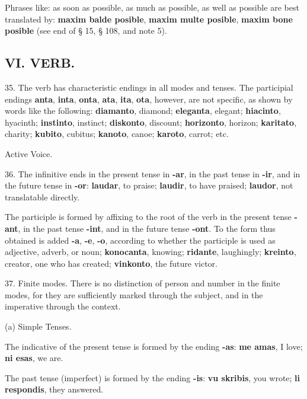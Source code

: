 Phrases like: as soon as possible, as much as possible, as well as possible are best translated by: \textbf{maxim balde posible}, \textbf{maxim multe posible}, \textbf{maxim bone posible} (see end of § 15, § 108, and note 5).

\subsection*{VI. VERB.}
35. The verb has characteristic endings in all modes and tenses. The participial endings \textbf{anta}, \textbf{inta}, \textbf{onta}, \textbf{ata}, \textbf{ita}, \textbf{ota}, however, are not specific, as shown by words like the following: \textbf{diamanto}, diamond; \textbf{eleganta}, elegant; \textbf{hiacinto}, hyacinth; \textbf{instinto}, instinct; \textbf{diskonto}, discount; \textbf{horizonto}, horizon; \textbf{karitato}, charity; \textbf{kubito}, cubitus; \textbf{kanoto}, canoe; \textbf{karoto}, carrot; etc. 

\Centering Active Voice. \\ \justifying

36. The infinitive ends in the present tense in \textbf{-ar}, in the past tense in \textbf{-ir}, and in the future tense in \textbf{-or}: \textbf{laudar}, to praise; \textbf{laudir}, to have praised; \textbf{laudor}, not translatable directly. 

The participle is formed by affixing to the root of the verb in the present tense \textbf{-ant}, in the past tense \textbf{-int}, and in the future tense \textbf{-ont}. To the form thus obtained is added \textbf{-a}, \textbf{-e}, \textbf{-o}, according to whether the participle is used as adjective, adverb, or noun; \textbf{konocanta}, knowing; \textbf{ridante}, laughingly; \textbf{kreinto}, creator, one who has created; \textbf{vinkonto}, the future victor. 

37. Finite modes. There is no distinction of person and number in the finite modes, for they are sufficiently marked through the subject, and in the imperative through the context. 

\Centering (a) Simple Tenses. \\ \justifying 

The indicative of the present tense is formed by the ending \textbf{-as}: \textbf{me amas}, I love; \textbf{ni esas}, we are. 

The past tense (imperfect) is formed by the ending \textbf{-is}: \textbf{vu skribis}, you wrote; \textbf{li respondis}, they answered. 

